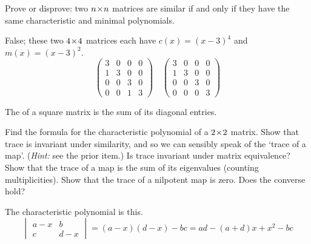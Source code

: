 \begin{exercises}
     Prove or disprove: two \( n \! \times \! n \) matrices are
     similar if and only if they have the same characteristic and
     minimal polynomials.
     \begin{answer}
       False; these two $4 \! \times \! 4$ matrices each have $c(x)=(x-3)^4$
       and $m(x)=(x-3)^2$.
       \begin{equation*}
          \begin{pmatrix}
             3  &0  &0  &0  \\
             1  &3  &0  &0  \\
             0  &0  &3  &0  \\
             0  &0  &1  &3
          \end{pmatrix}
          \quad
          \begin{pmatrix}
             3  &0  &0  &0  \\
             1  &3  &0  &0  \\
             0  &0  &3  &0  \\
             0  &0  &0  &3
          \end{pmatrix}
       \end{equation*} 
     \end{answer}
  \item 
    The  
    of a square matrix is the sum of its diagonal entries.
    \begin{exparts}
       \partsitem Find the formula for the characteristic polynomial of
         a $2 \! \times \! 2$ matrix.
       \partsitem Show that 
         trace is invariant under similarity, and so we can sensibly
         speak of the `trace of a map'.
         (\textit{Hint:}  see the prior item.)
       \partsitem Is trace invariant under matrix equivalence?
       \partsitem Show that the trace of a map is the sum of its eigenvalues
         (counting multiplicities).
       \partsitem Show that the trace of a nilpotent map is zero.
         Does the converse hold?
    \end{exparts}
    \begin{answer}
      \begin{exparts}
         \partsitem The characteristic polynomial is this. 
           \begin{equation*}
             \begin{vmatrix}
               a-x  &b  \\
               c  &d-x
             \end{vmatrix}
             =(a-x)(d-x)-bc=ad-(a+d)x+x^2-bc

\end{equation*}
\end{exparts}
\end{answer}
\end{exercises}
